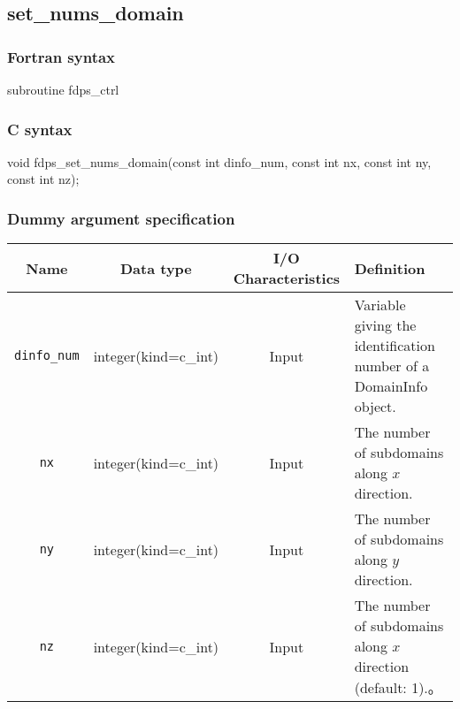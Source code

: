 \clearpage

\subsection{set\_nums\_domain}
\subsubsection*{Fortran syntax}
\begin{screen}
\begin{spverbatim}
subroutine fdps_ctrl%
\end{spverbatim}
\end{screen}

\subsubsection*{C syntax}
\begin{screen}
\begin{spverbatim}
void fdps_set_nums_domain(const int dinfo_num,
                          const int nx,
                          const int ny,
                          const int nz);
\end{spverbatim}
\end{screen}

\subsubsection*{Dummy argument specification}
\begin{table}[h]
\begin{tabularx}{\linewidth}{cccX}
\toprule
\rowcolor{Snow2}
Name & Data type & I/O Characteristics & Definition \\
\midrule
\texttt{dinfo\_num} & integer(kind=c\_int) & Input & Variable giving the identification number of a DomainInfo object.\\
\texttt{nx} & integer(kind=c\_int) & Input & The number of subdomains along $x$ direction. \\
\texttt{ny} & integer(kind=c\_int) & Input & The number of subdomains along $y$ direction.\\
\texttt{nz} & integer(kind=c\_int) & Input & The number of subdomains along $x$ direction (default: 1).。\\
\bottomrule
\end{tabularx}
\end{table}


